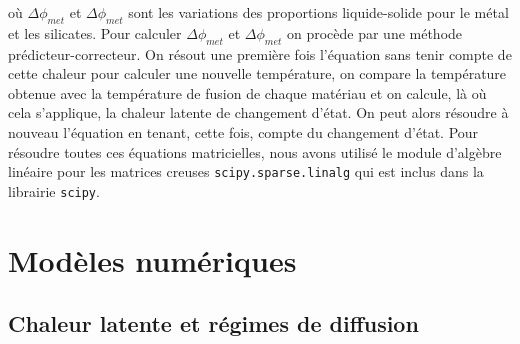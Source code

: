 \documentclass[10pt,a4paper]{article}
\numberwithin{equation}{section}
\begin{document}
où $\Delta \phi_{met}$ et $\Delta \phi_{met}$ sont les variations des proportions liquide-solide pour le métal et les silicates. Pour calculer $\Delta \phi_{met}$ et $\Delta \phi_{met}$ on procède par une méthode prédicteur-correcteur. On résout une première fois l'équation sans tenir compte de cette chaleur pour calculer une nouvelle température, on compare la température obtenue avec la température de fusion de chaque matériau et on calcule, là où cela s'applique, la chaleur latente de changement d'état. On peut alors résoudre à nouveau l'équation en tenant, cette fois, compte du changement d'état. Pour résoudre toutes ces équations matricielles, nous avons utilisé le module d'algèbre linéaire pour les matrices creuses \texttt{scipy.sparse.linalg} qui est inclus dans la librairie \texttt{scipy}.


\section{Modèles numériques}

\subsection{Chaleur latente et régimes de diffusion}
\end{document}
